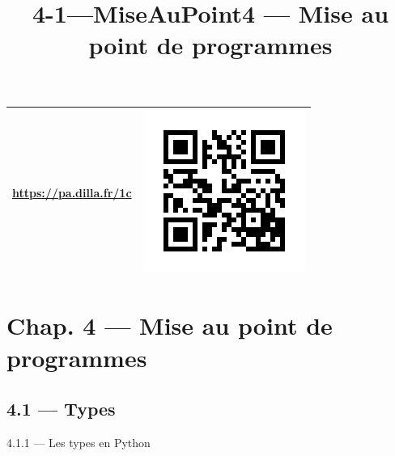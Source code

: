 \documentclass[a4paper,17pt]{extarticle}
\title{4-1---MiseAuPoint}
\begin{document}
    
    \title{4 --- Mise au point de programmes}

    
    

    
    \begin{longtable}[]{@{}ll@{}}
\toprule
\url{https://pa.dilla.fr/1c} &
\includegraphics{res/qr.png}\tabularnewline
\midrule
\endhead
\bottomrule
\end{longtable}

    \hypertarget{chap.-4-mise-au-point-de-programmes}{%
\section{Chap. 4 --- Mise au point de
programmes}\label{chap.-4-mise-au-point-de-programmes}}

    \hypertarget{types}{%
\subsection{4.1 --- Types}\label{types}}

    4.1.1 --- Les types en Python
\end{document}
